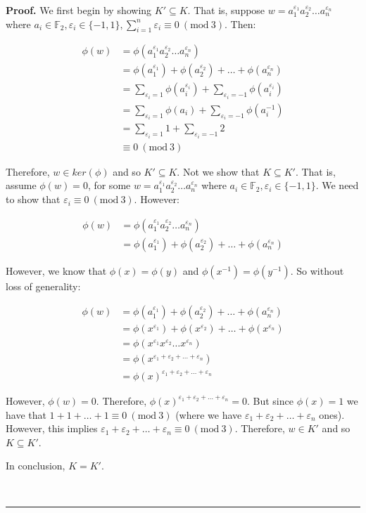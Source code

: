 \documentclass[12pt]{article}%
\newenvironment{proof}[1][Proof]{\textbf{#1.} }{\ \rule{0.5em}{0.5em}}
\newcommand{\F}{\mathbb{F}}
\newcommand{\Mod}[1]{\ (\mathrm{mod}\ #1)}
\begin{document}
\begin{proof}
We first begin by showing $K' \subseteq K$. That is, suppose
$w=a_{1}^{\varepsilon_1}a_{2}^{\varepsilon_2}\ldots a_{n}^{\varepsilon_n}$ where $a_i\in \F_2,
\varepsilon_i\in \{-1, 1\}, \sum_{i=1}^{n} \varepsilon_i \equiv 0 \Mod{3}$. Then:

\begin{align*}
\phi(w)
&=\phi(a_{1}^{\varepsilon_1}a_{2}^{\varepsilon_2}\ldots a_{n}^{\varepsilon_n}) \\
&=\phi(a_{1}^{\varepsilon_1})+\phi(a_{2}^{\varepsilon_2})+\ldots +\phi(a_{n}^{\varepsilon_n}) \\
&=\sum_{\varepsilon_i=1}  \phi(a_{i}^{\varepsilon_i})+\sum_{\varepsilon_i=-1}  \phi(a_{i}^{\varepsilon_i}) \\
&=\sum_{\varepsilon_i=1}  \phi(a_{i})+\sum_{\varepsilon_i=-1}  \phi(a_{i}^{-1}) \\
&=\sum_{\varepsilon_i=1}  1+\sum_{\varepsilon_i=-1}  2 \\
&\equiv 0 \Mod{3}
\end{align*}

Therefore, $w\in ker(\phi)$ and so $K' \subseteq K$. Not we show that $K \subseteq K'$. That is, assume
$\phi(w)=0$, for some $w=a_{1}^{\varepsilon_1}a_{2}^{\varepsilon_2}\ldots a_{n}^{\varepsilon_n}$ where
$a_i\in \F_2, \varepsilon_i\in \{-1, 1\}$. We need to show that $\varepsilon_i \equiv 0 \Mod{3}$. However:

\begin{align*}
\phi(w)
&=\phi(a_{1}^{\varepsilon_1}a_{2}^{\varepsilon_2}\ldots a_{n}^{\varepsilon_n}) \\
&=\phi(a_{1}^{\varepsilon_1})+\phi(a_{2}^{\varepsilon_2})+\ldots +\phi(a_{n}^{\varepsilon_n}) 
\end{align*}

However, we know that $\phi(x)=\phi(y)$ and $\phi(x^{-1})=\phi(y^{-1})$. So without loss of generality:

\begin{align*}
\phi(w)
&=\phi(a_{1}^{\varepsilon_1})+\phi(a_{2}^{\varepsilon_2})+\ldots +\phi(a_{n}^{\varepsilon_n}) \\
&=\phi(x^{\varepsilon_1})+\phi(x^{\varepsilon_2})+\ldots +\phi(x^{\varepsilon_n}) \\
&=\phi(x^{\varepsilon_1}x^{\varepsilon_2}\ldots x^{\varepsilon_n}) \\
&=\phi(x^{\varepsilon_1+\varepsilon_2+\ldots +\varepsilon_n}) \\
&=\phi(x)^{\varepsilon_1+\varepsilon_2+\ldots +\varepsilon_n}
\end{align*}

However, $\phi(w)=0$. Therefore, $\phi(x)^{\varepsilon_1+\varepsilon_2+\ldots +\varepsilon_n}=0$. But
since $\phi(x)=1$ we have that $1+1+\ldots+1\equiv 0\Mod3$ (where we have
$\varepsilon_1+\varepsilon_2+\ldots +\varepsilon_n$ ones). However, this implies 
$\varepsilon_1+\varepsilon_2+\ldots +\varepsilon_n \equiv 0 \Mod{3}$. Therefore, $w\in K'$ and so 
$K\subseteq K'$.

In conclusion, $K=K'$.

\end{proof}
\end{document}
